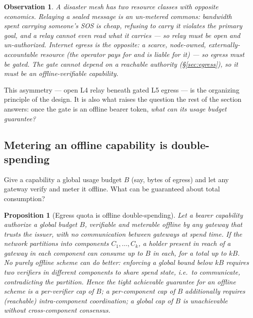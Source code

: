 \documentclass[11pt]{article}
\newtheorem{proposition}{Proposition}
\newtheorem{observation}{Observation}
\begin{document}
\begin{observation}\label{obs:asym}
A disaster mesh has two resource classes with opposite economics.
\emph{Relaying} a sealed message is an un-metered commons: bandwidth spent
carrying someone's SOS is cheap, refusing to carry it violates the primary goal,
and a relay cannot even read what it carries --- so relay must be \emph{open and
un-authorized}. \emph{Internet egress} is the opposite: a scarce, node-owned,
externally-accountable resource (the operator pays for and is liable for it) ---
so egress must be \emph{gated}. The gate cannot depend on a reachable authority
(\S\ref{sec:egress}), so it must be an offline-verifiable capability.
\end{observation}

This asymmetry --- open L4 relay beneath gated L5 egress --- is the organizing
principle of the design. It is also what raises the question the rest of the
section answers: once the gate is an offline bearer token, \emph{what can its
usage budget guarantee?}

\subsection{Metering an offline capability is double-spending}\label{sub:doublespend}

Give a capability a global usage budget $B$ (say, bytes of egress) and let any
gateway verify and meter it offline. What can be guaranteed about total
consumption?

\begin{proposition}[Egress quota is offline double-spending]\label{prop:doublespend}
Let a bearer capability authorize a global budget $B$, verifiable and meterable
offline by any gateway that trusts the issuer, with no communication between
gateways at spend time. If the network partitions into components
$C_1,\dots,C_k$, a holder present in reach of a gateway in each component can
consume up to $B$ in \emph{each}, for a total up to $kB$. No purely offline scheme
can do better: enforcing a global bound below $kB$ requires two verifiers in
different components to share spend state, i.e.\ to communicate, contradicting the
partition. Hence the tight achievable guarantee for an offline scheme is a
\emph{per-verifier} cap of $B$; a per-\emph{component} cap of $B$ additionally
requires (reachable) intra-component coordination; a \emph{global} cap of $B$ is
unachievable without cross-component consensus.
\end{proposition}
\end{document}
